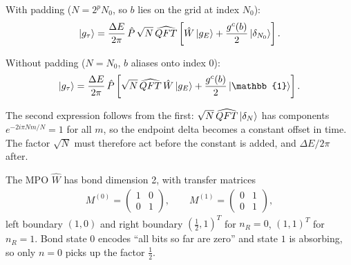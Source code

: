 \documentclass{article}
\begin{document}
	With padding ($N = 2^p N_0$, so $b$ lies on the grid at index $N_0$):
	\begin{align}
		\ket{g_\tau} = \frac{\Delta E}{2\pi}\, \hat{P}\, \sqrt{N}\, \widehat{QFT}
		\left[ \hat{W}\ket{g_E} + \frac{g^c(b)}{2}\ket{\delta_{N_0}} \right].
	\end{align}
	
	Without padding ($N = N_0$, $b$ aliases onto index $0$):
	\begin{align}
		\ket{g_\tau} = \frac{\Delta E}{2\pi}\, \hat{P}
		\left[ \sqrt{N}\, \widehat{QFT}\, \hat{W}\ket{g_E} + \frac{g^c(b)}{2}\ket{\mathbb{1}} \right].
	\end{align}
	
	The second expression follows from the first: $\sqrt{N}\,\widehat{QFT}\ket{\delta_N}$
	has components $e^{-2i\pi Nm/N}=1$ for all $m$, so the endpoint delta becomes a
	constant offset in time. The factor $\sqrt{N}$ must therefore act before the
	constant is added, and $\Delta E/2\pi$ after.
	
	The MPO $\hat{W}$ has bond dimension 2, with transfer matrices
	\begin{align}
		M^{(0)} = \begin{pmatrix} 1 & 0 \\ 0 & 1 \end{pmatrix}, \qquad
		M^{(1)} = \begin{pmatrix} 0 & 1 \\ 0 & 1 \end{pmatrix},
	\end{align}
	left boundary $(1,0)$ and right boundary ${(\tfrac12,1)}^T$ for $n_R=0$,
	${(1,1)}^T$ for $n_R=1$. Bond state $0$ encodes ``all bits so far are zero'' and
	state $1$ is absorbing, so only $n=0$ picks up the factor $\tfrac12$.
	
\end{document}
